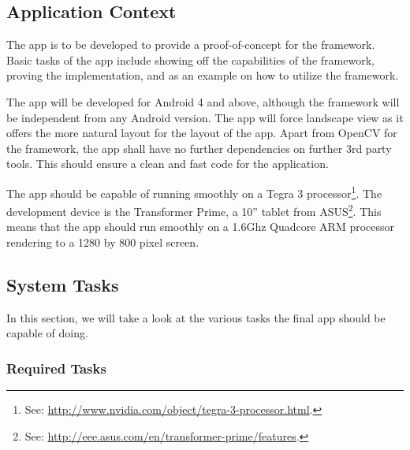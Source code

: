 \subsection{Application Context}

The app is to be developed to provide a proof-of-concept for the framework.
Basic tasks of the app include showing off the capabilities of the framework, proving the implementation, and as an example on how to utilize the framework.

The app will be developed for Android 4 and above, although the framework will be independent from any Android version.
The app will force landscape view as it offers the more natural layout for the layout of the app.
Apart from OpenCV for the framework, the app shall have no further dependencies on further 3rd party tools.
This should ensure a clean and fast code for the application.

The app should be capable of running smoothly on a Tegra 3 processor\footnote{See: \url{http://www.nvidia.com/object/tegra-3-processor.html}.}.
The development device is the Transformer Prime, a 10'' tablet from ASUS\footnote{See: \url{http://eee.asus.com/en/transformer-prime/features}.}.
This means that the app should run smoothly on a 1.6Ghz Quadcore ARM processor rendering to a 1280 by 800 pixel screen.

\subsection{System Tasks}

In this section, we will take a look at the various tasks the final app should be capable of doing.

\subsubsection*{Required Tasks}

